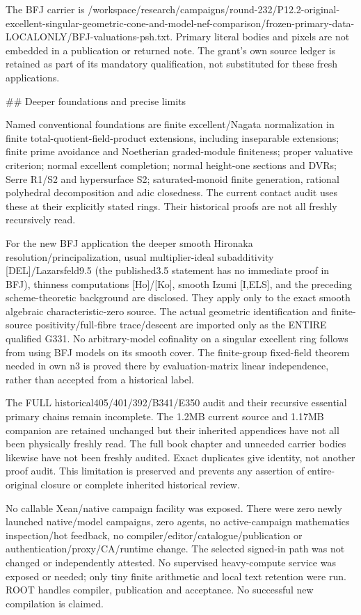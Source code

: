 \documentclass[11pt]{article}
\begin{document}
\begin{RetainedDATA}
The BFJ carrier is /workspace/research/campaigns/round-232/P12.2-original-excellent-singular-geometric-cone-and-model-nef-comparison/frozen-primary-data-LOCALONLY/BFJ-valuations-psh.txt. Primary literal bodies and pixels are not embedded in a publication or returned note. The grant's own source ledger is retained as part of its mandatory qualification, not substituted for these fresh applications.

## Deeper foundations and precise limits

Named conventional foundations are finite excellent/Nagata normalization in finite total-quotient-field-product extensions, including inseparable extensions; finite prime avoidance and Noetherian graded-module finiteness; proper valuative criterion; normal excellent completion; normal height-one sections and DVRs; Serre R1/S2 and hypersurface S2; saturated-monoid finite generation, rational polyhedral decomposition and adic closedness. The current contact audit uses these at their explicitly stated rings. Their historical proofs are not all freshly recursively read.

For the new BFJ application the deeper smooth Hironaka resolution/principalization, usual multiplier-ideal subadditivity [DEL]/Lazarsfeld9.5 (the published3.5 statement has no immediate proof in BFJ), thinness computations [Ho]/[Ko], smooth Izumi [I,ELS], and the preceding scheme-theoretic background are disclosed. They apply only to the exact smooth algebraic characteristic-zero source. The actual geometric identification and finite-source positivity/full-fibre trace/descent are imported only as the ENTIRE qualified G331. No arbitrary-model cofinality on a singular excellent ring follows from using BFJ models on its smooth cover. The finite-group fixed-field theorem needed in own n3 is proved there by evaluation-matrix linear independence, rather than accepted from a historical label.

The FULL historical405/401/392/B341/E350 audit and their recursive essential primary chains remain incomplete. The 1.2MB current source and 1.17MB companion are retained unchanged but their inherited appendices have not all been physically freshly read. The full book chapter and unneeded carrier bodies likewise have not been freshly audited. Exact duplicates give identity, not another proof audit. This limitation is preserved and prevents any assertion of entire-original closure or complete inherited historical review.

No callable Xean/native campaign facility was exposed. There were zero newly launched native/model campaigns, zero agents, no active-campaign mathematics inspection/hot feedback, no compiler/editor/catalogue/publication or authentication/proxy/CA/runtime change. The selected signed-in path was not changed or independently attested. No supervised heavy-compute service was exposed or needed; only tiny finite arithmetic and local text retention were run. ROOT handles compiler, publication and acceptance. No successful new compilation is claimed.


\end{RetainedDATA}
\end{document}
